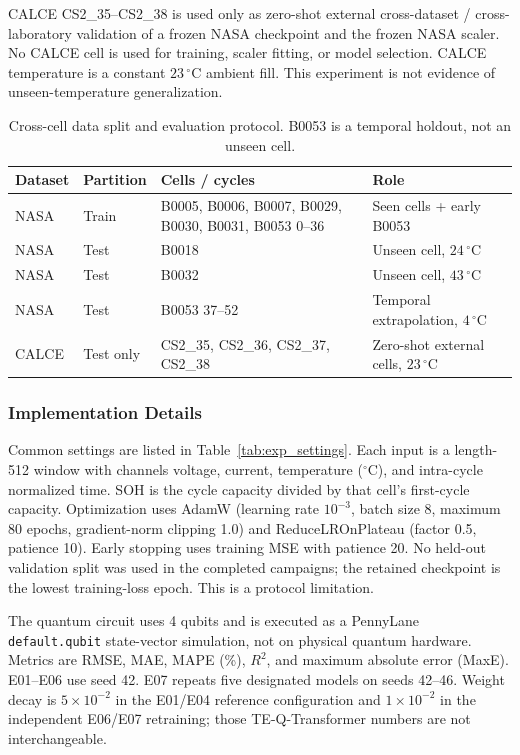 CALCE CS2\_35--CS2\_38 is used only as zero-shot external cross-dataset / cross-laboratory validation of a frozen NASA checkpoint and the frozen NASA scaler. No CALCE cell is used for training, scaler fitting, or model selection. CALCE temperature is a constant $23\,^\circ$C ambient fill. This experiment is not evidence of unseen-temperature generalization.

\begin{table}[t]
\caption{Cross-cell data split and evaluation protocol. B0053 is a temporal holdout, not an unseen cell.}\label{tab:exp_split}
\begin{tabular*}{\tblwidth}{@{}LLLL@{}}
\toprule
Dataset & Partition & Cells / cycles & Role \\
\midrule
NASA & Train & B0005, B0006, B0007, B0029, B0030, B0031, B0053 0--36 & Seen cells + early B0053 \\
NASA & Test & B0018 & Unseen cell, $24\,^\circ$C \\
NASA & Test & B0032 & Unseen cell, $43\,^\circ$C \\
NASA & Test & B0053 37--52 & Temporal extrapolation, $4\,^\circ$C \\
CALCE & Test only & CS2\_35, CS2\_36, CS2\_37, CS2\_38 & Zero-shot external cells, $23\,^\circ$C \\
\bottomrule
\end{tabular*}
\end{table}

\subsubsection{Implementation Details}
\label{sec:implementation_details}

Common settings are listed in Table~\ref{tab:exp_settings}. Each input is a length-512 window with channels voltage, current, temperature ($^\circ$C), and intra-cycle normalized time. SOH is the cycle capacity divided by that cell's first-cycle capacity. Optimization uses AdamW (learning rate $10^{-3}$, batch size 8, maximum 80 epochs, gradient-norm clipping 1.0) and ReduceLROnPlateau (factor 0.5, patience 10). Early stopping uses training MSE with patience 20. No held-out validation split was used in the completed campaigns; the retained checkpoint is the lowest training-loss epoch. This is a protocol limitation.

The quantum circuit uses 4 qubits and is executed as a PennyLane \mbox{\texttt{default.qubit}} state-vector simulation, not on physical quantum hardware. Metrics are RMSE, MAE, MAPE (\%), $R^2$, and maximum absolute error (MaxE). E01--E06 use seed 42. E07 repeats five designated models on seeds 42--46. Weight decay is $5\times10^{-2}$ in the E01/E04 reference configuration and $1\times10^{-2}$ in the independent E06/E07 retraining; those TE-Q-Transformer numbers are not interchangeable.

